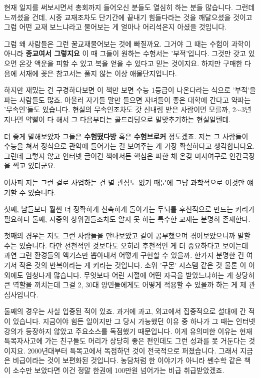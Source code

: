 현재 일지를 써보시면서 총회까지 들어오신 분들도 열심히 하는 분들 많습니다.
그런데 느끼셨을 건데, 시중 교재조차도 단기간에 끝내기 힘들다라는 것을 깨달으셨을 것이고
그럼 어떤 교재 보느냐라고 물어보는 게 얼마나 어리석은지 아셨을 것입니다.
\vspace{5mm}

그럼 왜 사람들은 그런 꿀교재물어보는 것에 빠질까요. 그거야 그 때는 수험이 과학이 아니라 \textbf{종교여서 그렇지요}
이 때 그들이 원하는 수험서는 '부적'입니다. 그것만 갖고 있으면 온갖 액운을 피할 수 있고 복을 얻을 수 있다고 믿는 것이지요.
하지만 구매한 다음에 서재에 꽂은 참고서는 풀지 않는 이상 애물단지입니다.
\vspace{5mm}

하지만 재밌는 건 구경하다보면 이 책만 보면 수능 1등급이 나온다라는 식으로 '부적'을 파는 사람들도 많죠.
아울러 자기들 말만 들으면 자녀들이 좋은 대학에 간다고 약파는 '무속인'들도 있습니다.
현실의 무속인조차도 갓 신내림 받은 사람이면 모를까, 2$\sim$3년 지나면 약빨이 다 해서 그 다음부터는 콜드리딩으로 말맞추기하는 현실일텐데.
\vspace{5mm}

더 좋게 말해보았자 그들은 \textbf{수험떴다방} 혹은 \textbf{수험브로커} 정도겠죠.
저는 그 사람들이 수능을 쳐서 정식으로 관악에 들어가는 걸 보여주는 게 가장 확실하다고 생각합니다요.
그런데 그렇지 않고 인터넷 글이건 책에서든 핵심은 피한 채 온갖 미사여구로 인간극장을 찍고 있더군요.
\vspace{5mm}

어차피 저는 그런 걸로 사업하는 건 별 관심도 없기 때문에 그냥 과학적으로 이것만 얘기할 수 있습니다.
\vspace{5mm}

첫째, 남들보다 훨씬 더 정확하게 신속하게 돌아가는 두뇌를 후천적으로 만드는 커리가 필요하다
둘째, 시중의 상위권들조차도 알지 못 하는 특수한 교재는 분명히 존재한다.
\vspace{5mm}

첫째의 경우는 저도 그런 사람들을 만나보았고 같이 공부했으며 겪어보았으니까 말할 수는 있습니다.
다만 선천적인 것보다도 오히려 후천적인 게 더 중요하다고 보이는데 과연 그런 환경들의 엑기스만 뽑아내서 어떻게 구현할 수 있을까.
한가지 분명한 건 여기서 작은 것의 반복이라는 게 키라는 것입니다. 소위 '구몬' 시스템 같은 것
물론 이 이외에도 엄청나게 많습니다. 무엇보다 어린 시절에 어떤 자극을 받았느냐하는 게 상당히 큰 역할을 끼치는데
그걸 2, 30대 양민들에게도 어떻게 적용할 수 있을까 하는 게 제 관심사입니다.
\vspace{5mm}

둘째의 경우는 사실 입증된 적이 있죠. 과거에 과고, 외고에서 집중적으로 설대에 간 적이 있습니다.
지금이야 힘든 일이지만 그 당시 가능했던 이유 중 하나가 그 때는 인터넷 강의가 등장하지 않았고 주요소스를 독점했기 때문입니다.
이게 유의미한 이유는 현재 특목자사고에 가는 친구들도 머리가 상당히 좋은 편인데도 그런 성과를 못 거둔다는 것이지요.
2000년대부터 특목고에서 독점하던 것이 전국적으로 퍼졌습니다. 그래서 지금은 비급이라는 것이 보편화된 것입니다.
농담처럼 한 이야기가 아니라 쎈수학 같은 책이 소수만 보았다면 이건 정말 한권에 100만원 넘어가는 비급 취급받았겠죠.
\vspace{5mm}

